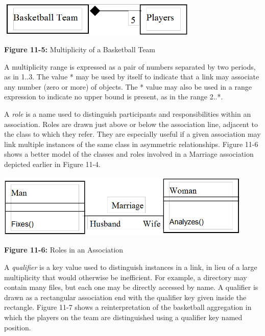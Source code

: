 \begin{center}
\includegraphics[width=3.78in,height=0.63in]{ub-img/multipcy.png}

{\sffamily\bfseries Figure 11-5:}
{\sffamily Multiplicity of a Basketball Team}
\end{center}

A multiplicity range is expressed as a pair of numbers separated by two
periods, as in 1..3. The value * may be used by itself to indicate that
a link may associate any number (zero or more) of objects. The * value
may also be used in a range expression to indicate no upper bound is
present, as in the range 2..*.

A \textit{role} is a name used to distinguish
participants and responsibilities within an association. Roles are
drawn just above or below the association line, adjacent to the class
to which they refer. They are especially useful if a given association
may link multiple instances of the same class in asymmetric
relationships. Figure 11-6 shows a better model of the classes and
roles involved in a Marriage association depicted earlier in Figure
11-4.

\bigskip

\includegraphics[width=4.8in,height=1.2in]{ub-img/roles.png}


{\sffamily\bfseries Figure 11-6:}
{\sffamily Roles in an Association}

\bigskip

A \textit{qualifier} is a key value used to
distinguish instances in a link, in lieu of a large
multiplicity that would otherwise be inefficient. For example, a
directory may contain many files, but each one may be directly accessed
by name. A qualifier is drawn as a rectangular association end with the
qualifier key given inside the rectangle. Figure 11-7 shows a
reinterpretation of the basketball aggregation in which the players on
the team are distinguished using a qualifier key named position.


